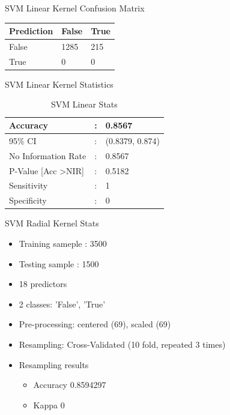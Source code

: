 \documentclass{beamer}
\begin{document}
\begin{frame}{SVM Linear Kernel Confusion Matrix}
	\begin{table}
		\begin{tabular}{lll}
			\hline
			Prediction & False & True \\
			\hline
			False & 1285 & 215 \\
			\hline
			True & 0 & 0 \\
			\hline
		\end{tabular}
	\end{table}
\end{frame}

\begin{frame}{SVM Linear Kernel Statistics}
	\begin{table}[]
		\centering
		\caption{SVM Linear Stats}
		\label{svm-l-stats}
		\begin{tabular}{p{5cm}p{1cm}p{5cm}}
			Accuracy  & : & 0.8567 \\
			\hline
			95\% CI   & : & (0.8379, 0.874) \\ \hline
			No Information Rate  & : & 0.8567 \\ \hline
			P-Value {[}Acc \textgreater NIR{]}  & : & 0.5182 \\ \hline
			Sensitivity  & : & 1 \\ \hline
			Specificity  & : & 0 \\ \hline
			
		\end{tabular}
	\end{table}
\end{frame}

\begin{frame}{SVM Radial Kernel Stats}
	\begin{itemize}
		\item Training sameple : 	3500
		\item Testing sample : 1500
		\item 18 predictors
		\item 2 classes: 'False', 'True' 
		\item Pre-processing: centered (69), scaled (69) 
		\item Resampling: Cross-Validated (10 fold, repeated 3 times) 
		\item Resampling results
		\begin{itemize}
			\item Accuracy  0.8594297
			\item Kappa      0
		\end{itemize}
	\end{itemize}
\end{frame}
\end{document}
